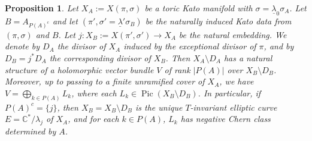 \documentclass[JEP,XML,SOM,Unicode,NoFloatCountersInSection]{cedram}
\newtheorem{proposition}[theorem]{Proposition}
\theoremstyle{definition}
\let\la\lambda
\let\sminus\setminus
\let\un\underline
\newcommand{\CC}{\mathbb{C}}
\DeclareMathOperator{\Pic}{Pic}
\begin{document}
\begin{proposition}
Let $X_A:=X(\pi,\sigma)$ be a toric Kato manifold with $\sigma=\un\la_0\sigma_A$. Let $B=A_{P(A)^c}$ and let $(\pi',\sigma'=\un\la'\sigma_B)$ be the naturally induced Kato data from $(\pi,\sigma)$ and $B$. Let $j:X_B:=X(\pi',\sigma')\to X_A$ be the natural embedding. We denote by $D_A$ the divisor of $X_A$ induced by the exceptional divisor of $\pi$, and by $D_B=j^*D_A$ the corresponding divisor of $X_B$. Then $X_A\sminus D_A$ has a natural structure of a holomorphic vector bundle $V$ of rank $|P(A)|$ over $X_B\sminus D_B$. Moreover, up to passing to a finite unramified cover of $X_A$, we have $V\!=\!\bigoplus_{k\in P(A)} L_k$, where each \hbox{$L_k\!\in\!\Pic(X_B\sminus D_B)$}. In particular, if $P(A)^c=\{j\}$, then $X_B=X_B\sminus D_B$ is the unique $T$-invariant elliptic curve $E=\CC^*/\la_j$ of $X_A$, and for each $k\in P(A)$, $L_k$ has negative Chern class determined by $A$.
\end{proposition}
\end{document}
